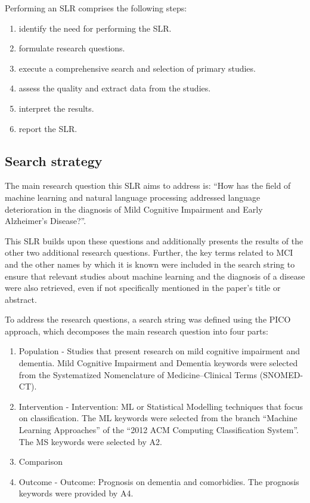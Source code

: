 Performing an SLR comprises the following steps: 

\begin{enumerate}
	\item identify the need for performing the SLR.
	\item formulate research questions.
	\item execute a comprehensive search and selection of primary studies.
	\item assess the quality and extract data from the studies.
	\item interpret the results.
	\item report the SLR.
\end{enumerate}

\subsection{Search strategy}
The main research question this SLR aims to address is: “How has the field of machine learning and natural language processing addressed language deterioration in the diagnosis of Mild Cognitive Impairment and Early Alzheimer's Disease?”. 

This SLR builds upon these questions and additionally presents the results of the other two additional research questions. Further, the key terms related to MCI and the other names by which it is known were included in the search string to ensure that relevant studies about machine learning and the diagnosis of a disease were also retrieved, even if not specifically mentioned in the paper's title or abstract.
\par 
To address the research questions, a search string was defined using the PICO approach, which decomposes the main research question into four parts: 
\begin{enumerate}
	\item Population - Studies that present research on mild cognitive impairment and dementia. Mild Cognitive Impairment and Dementia keywords were selected from the Systematized Nomenclature of Medicine–Clinical Terms (SNOMED-CT).
	\item Intervention - Intervention: ML or Statistical Modelling techniques that focus on classification. The ML keywords were selected from the branch “Machine Learning Approaches” of the “2012 ACM Computing Classification System”. The MS keywords were selected by A2.
	\item Comparison
	\item Outcome - Outcome: Prognosis on dementia and comorbidies. The prognosis keywords were provided
by A4.
\end{enumerate}

